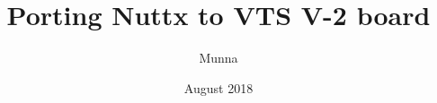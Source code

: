 \documentclass[a4paper,12pt]{book}
\begin{document}
\author{Munna}
\title{Porting Nuttx to VTS V-2 board}
\date{August 2018}

\frontmatter
\maketitle
\tableofcontents

\mainmatter



\backmatter
\end{document}
